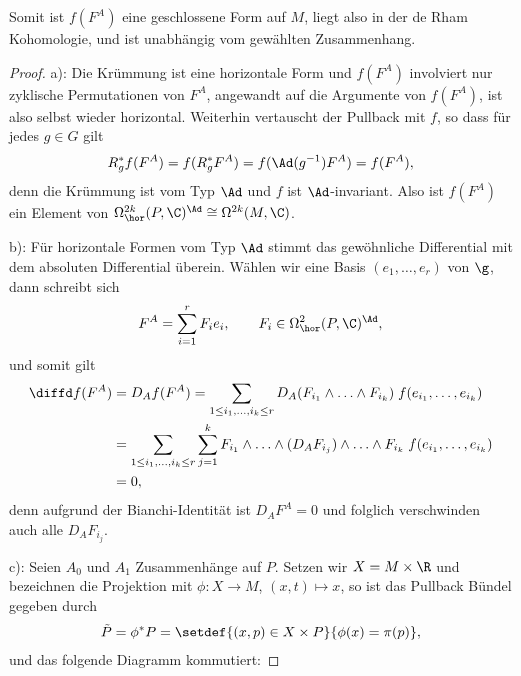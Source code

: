 \documentclass[%
	paper=a5,%
	fleqn,%
	DIV=18,%
	BCOR=0mm,
	fontsize=11pt,
	titlepage=false,%
	bibliography=totoc,
	DIV=18,%
	twoside=true,
	pdftitle=Riemannsche Geometrie,
	pdfauthor=Uwe Semmelmann,
	numbers=noendperiod]%
	{scrbook}
\begin{document}
Somit ist $f(F^A)$ eine geschlossene Form auf $M$, liegt also in der de Rham
Kohomologie, und ist unabhängig vom gewählten Zusammenhang.

\begin{proof}
a): Die Krümmung ist eine horizontale Form und $f(F^A)$ involviert nur zyklische
Permutationen von $F^A$, angewandt auf die Argumente von $f(F^A)$, ist also
selbst wieder horizontal. Weiterhin vertauscht der Pullback mit $f$, so dass für
jedes $g\in G$ gilt
\begin{align*}
R_g^*f(F^A) = f(R_g^* F^A) = f(\Ad(g^{-1})F^A) = f(F^A), 
\end{align*}
denn die Krümmung ist vom Typ $\Ad$ und $f$ ist $\Ad$-invariant. Also ist
$f(F^A)$ ein Element von $\Omega^{2k}_\hor(P,\C)^{\Ad}\cong \Omega^{2k}(M,\C)$.

b): Für horizontale Formen vom Typ $\Ad$ stimmt das gewöhnliche Differential mit
dem absoluten Differential überein. Wählen wir eine Basis $(e_1,\ldots,e_r)$ von
$\g$, dann schreibt sich
\begin{align*}
F^A = \sum_{i=1}^r F_i e_i,\qquad F_i\in \Omega_\hor^2(P,\C)^{\Ad},
\end{align*}
und somit gilt
\begin{align*}
\diffd f(F^A) &= D_A f(F^A)
=  \sum_{1\le i_1,\ldots,i_k \le r} D_A(F_{i_1}\wedge \ldots \wedge F_{i_k})\;
f(e_{i_1},\ldots,e_{i_k})\\
&= 
\sum_{1\le i_1,\ldots,i_k \le r} \sum_{j=1}^k F_{i_1}\wedge \ldots\wedge (D_A
F_{i_j}) \wedge \ldots \wedge F_{i_k}\; f(e_{i_1},\ldots,e_{i_k})\\
&=0,
\end{align*}
denn aufgrund der Bianchi-Identität ist $D_A F^A = 0$ und folglich verschwinden
auch alle $D_A F_{i_j}$.

c): Seien $A_0$ und $A_1$ Zusammenhänge auf $P$. Setzen wir $X= M\times \R$ und
bezeichnen die Projektion mit
$\phi: X\to M$, $(x,t)\mapsto x$,
so ist das Pullback Bündel gegeben durch
\begin{align*}
\tilde{P} = \phi^*P = \setdef{(x,p)\in X\times P}{\phi(x)=\pi(p)},
\end{align*}
und das folgende Diagramm kommutiert:

{

\centering


}
\end{proof}
\end{document}
